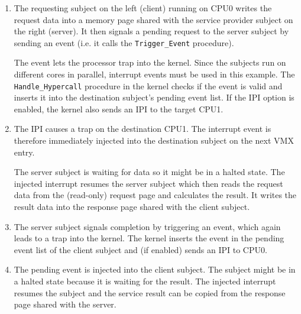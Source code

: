 \begin{enumerate}
	\item The requesting subject on the left (client) running on CPU0 writes
		the request data into a memory page shared with the service provider
		subject on the right (server). It then signals a pending request to the
		server subject by sending an event (i.e. it calls the
		\texttt{Trigger\_Event} procedure).

		The event lets the processor trap into the kernel. Since the subjects
		run on different cores in parallel, interrupt events must be used in
		this example. The \texttt{Handle\_Hypercall} procedure in the kernel
		checks if the event is valid and inserts it into the destination
		subject's pending event list. If the IPI option is enabled, the kernel
		also sends an IPI to the target CPU1.
	\item The IPI causes a trap on the destination CPU1. The interrupt
		event is therefore immediately injected into the destination subject on
		the next VMX entry.

		The server subject is waiting for data so it might be in a halted
		state.  The injected interrupt resumes the server subject which then
		reads the request data from the (read-only) request page and calculates
		the result. It writes the result data into the response page shared
		with the client subject.
	\item The server subject signals completion by triggering an event, which
		again leads to a trap into the kernel. The kernel inserts the event in
		the pending event list of the client subject and (if enabled) sends an
		IPI to CPU0.
	\item The pending event is injected into the client subject. The subject
		might be in a halted state because it is waiting for the result. The
		injected interrupt resumes the subject and the service result can be
		copied from the response page shared with the server.
\end{enumerate}
